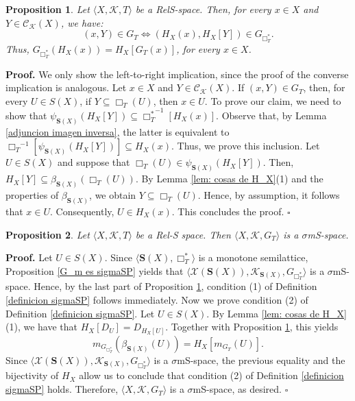 \documentclass{article}
\newtheorem{proposition}{\bf Proposition}[section]
\newenvironment{proof}
{\par\noindent\textbf{Proof. }\rm}
{\hfill$\boldsymbol{\square}$\par\vspace{0.3cm}}
\begin{document}
\begin{proposition}\label{G_T sii G_box T*}
Let $\langle X, \mathcal{K}, T \rangle$ be a RelS-space. Then, for every $x\in X$ and $Y\in \mathcal{C}_{\mathcal{K}}(X)$, we have:
\[
(x,Y) \in G_T \iff (H_X(x), H_X[Y]) \in G_{\Box_T^{*}}.
\]
Thus, $G_{\Box^{\ast}_T}(H_X(x))=H_X[G_T(x)]$, for every $x\in X$.
\end{proposition}
\begin{proof}
   We only show the left-to-right implication, since the proof of the converse implication is analogous. Let $x\in X$ and $Y \in \mathcal{C_K}(X)$. If $(x,Y) \in G_T$, then, for every $U\in S(X)$, if $Y\subseteq \Box_T(U)$, then $x \in U$. To prove our claim, we need to show that $\psi_{\mathbf{S}(X)}(H_X[Y]) \subseteq{\Box_T^{*}}^{-1}[H_X(x)]$. Observe that, by Lemma \ref{adjuncion imagen inversa}, the latter is equivalent to ${\Box_T}^{-1}[\psi_{\mathbf{S}(X)}(H_X[Y])] \subseteq H_X(x)$. Thus, we prove this inclusion. Let $U\in S(X)$ and suppose that ${\Box_T}(U)\in \psi_{\mathbf{S}(X)}(H_X[Y])$. Then, $H_X[Y]\subseteq \beta_{\mathbf{S}(X)}({\Box_T}(U))$. By Lemma \ref{lem: cosas de H_X}(1) and the properties of $\beta_{\mathbf{S}(X)}$, we obtain $Y\subseteq \Box_T(U)$. Hence, by assumption, it follows that $x\in U$. Consequently, $U\in H_X(x)$. This concludes the proof.
\end{proof}

\begin{proposition}\label{prop: Rel-Sp to sigmaSp}
    Let  $\langle X, \mathcal{K}, T \rangle$ be a Rel-S space. Then $\langle X, \mathcal{K}, G_T \rangle$ is a $\sigma$mS-space.
\end{proposition}
\begin{proof}
Let $U \in S(X)$. Since $\langle \mathbf{S}(X),\Box_T^{*}\rangle$ is a monotone semilattice, Proposition \ref{G_m es sigmaSP} yields that $\langle \mathcal{X}(\mathbf{S}(X)), \mathcal{K}_{\mathbf{S}(X)}, G_{\Box_T^{*}}\rangle$ is a $\sigma$mS-space. Hence, by the last part of Proposition \ref{G_T sii G_box T*}, condition (1) of Definition \ref{definicion sigmaSP} follows immediately. Now we prove condition (2) of Definition \ref{definicion sigmaSP}. Let $U \in S(X)$. By Lemma \ref{lem: cosas de H_X}(1), we have that $H_X[D_U]=D_{H_X[U]}$. Together with Proposition \ref{G_T sii G_box T*}, this yields
\[
m_{G_{\Box_T^{*}}}(\beta_{\mathbf{S}(X)}(U))=H_{X}[m_{G_T}(U)].
\]
Since $\langle \mathcal{X}(\mathbf{S}(X)), \mathcal{K}_{\mathbf{S}(X)}, G_{\Box_T^{*}}\rangle$ is a $\sigma$mS-space, the previous equality and the bijectivity of $H_X$ allow us to conclude that condition (2) of Definition \ref{definicion sigmaSP} holds. Therefore, $\langle X, \mathcal{K}, G_T \rangle$ is a $\sigma$mS-space, as desired.
\end{proof} 
\end{document}
